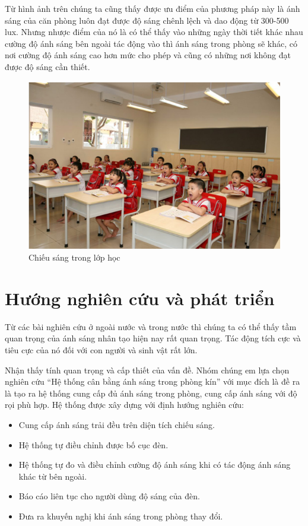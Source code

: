 Từ hình ảnh trên chúng ta cũng thấy được ưu điểm của phương pháp này là ánh sáng của căn phòng luôn đạt được độ sáng chênh lệch và dao động từ 300-500 lux. Nhưng nhược điểm của nó là có thể thấy vào những ngày thời tiết khác nhau cường độ ánh sáng bên ngoài tác động vào thì ánh sáng trong phòng sẽ khác, có nơi cường độ ánh sáng cao hơn mức cho phép và cũng có những nơi không đạt được độ sáng cần thiết.
\begin{center}
    \begin{figure}[!htp]
    \begin{center}
     \includegraphics[scale=0.9]{Chapters/Chapter2/ImagesChapter2/Lophoc}
    \end{center}
    \caption{Chiếu sáng trong lớp học}
    \label{fig:lophoc}
    \end{figure}
\end{center}

\section{Hướng nghiên cứu và phát triển}
Từ các bài nghiên cứu ở ngoài nước và trong nước thì chúng ta có thể thấy tầm quan trọng của ánh sáng nhân tạo hiện nay rất quan trọng. Tác động tích cực và tiêu cực của nó đối với con người và sinh vật rất lớn.

Nhận thấy tính quan trọng và cấp thiết của vấn đề. Nhóm chúng em lựa chọn nghiên cứu “Hệ thống cân bằng ánh sáng trong phòng kín” với mục đích là đề ra là tạo ra hệ thống cung cấp đủ ánh sáng trong phòng, cung cấp ánh sáng với độ rọi phù hợp. Hệ thống được xây dựng với định hướng nghiên cứu:
\begin{itemize}
\item Cung cấp ánh sáng trải đều trên diện tích chiếu sáng.
\item Hệ thống tự điều chỉnh được bố cục đèn.
\item Hệ thống tự đo và điều chỉnh cường độ ánh sáng khi có tác động ánh sáng khác từ bên ngoài.
\item Báo cáo liên tục cho người dùng độ sáng của đèn.
\item Đưa ra khuyến nghị khi ánh sáng trong phòng thay đổi. 
\end{itemize}

